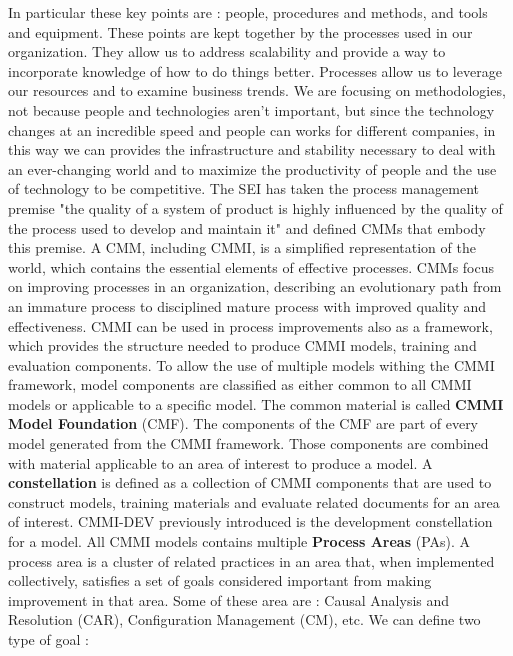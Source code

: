 In particular these key points are : people, procedures and methods, and tools and equipment. These points are kept together by the processes used in our organization. They allow us to address scalability and provide a way to incorporate knowledge of how to do things better. Processes allow us to leverage our resources and to examine business trends. We are focusing on methodologies, not because people and technologies aren't important, but since the technology changes at an incredible speed and people can works for different companies, in this way we can provides the infrastructure and stability necessary to deal with an ever-changing world and to maximize the productivity of people and the use of technology to be competitive. The SEI has taken the process management premise "the quality of a system of product is highly influenced by the quality of the process used to develop and maintain it" and defined CMMs that embody this premise. A CMM, including CMMI, is a simplified representation of the world, which contains the essential elements of effective processes. CMMs focus on improving processes in an organization, describing an evolutionary path from an immature process to disciplined mature process with improved quality and effectiveness. CMMI can be used in process improvements also as a framework, which provides the structure needed to produce CMMI models, training and evaluation components. To allow the use of multiple models withing the CMMI framework, model components are classified as either common to all CMMI models or applicable to a specific model. The common material is called \textbf{CMMI Model Foundation} (CMF). The components of the CMF are part of every model generated from the CMMI framework. Those components are combined with material applicable to an area of interest to produce a model. A \textbf{constellation} is defined as a collection of CMMI components that are used to construct models, training materials and evaluate related documents for an area of interest. CMMI-DEV previously introduced is the development constellation for a model. All CMMI models contains multiple \textbf{Process Areas} (PAs). A process area is a cluster of related practices in an area that, when implemented collectively, satisfies a set of goals considered important from making improvement in that area. Some of these area are : Causal Analysis and Resolution (CAR), Configuration Management (CM), etc. We can define two type of goal :
